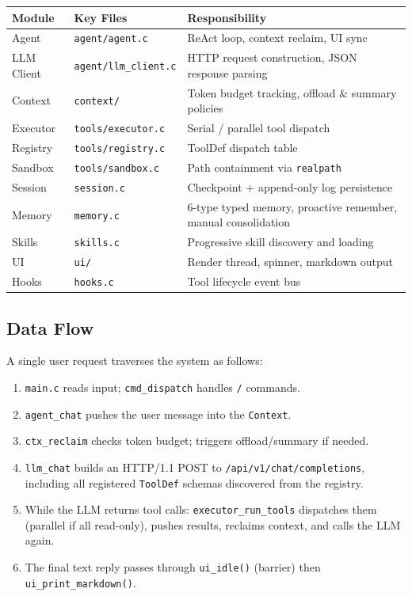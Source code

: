 \documentclass[11pt,a4paper]{article}
\begin{document}
\begin{center}
\small
\begin{tabularx}{\textwidth}{l l X}
\toprule
\textbf{Module} & \textbf{Key Files} & \textbf{Responsibility} \\
\midrule
Agent      & \texttt{agent/agent.c}      & ReAct loop, context reclaim, UI sync \\
LLM Client & \texttt{agent/llm\_client.c} & HTTP request construction, JSON response parsing \\
Context    & \texttt{context/}           & Token budget tracking, offload \& summary policies \\
Executor   & \texttt{tools/executor.c}   & Serial / parallel tool dispatch \\
Registry   & \texttt{tools/registry.c}   & ToolDef dispatch table \\
Sandbox    & \texttt{tools/sandbox.c}    & Path containment via \texttt{realpath} \\
Session    & \texttt{session.c}          & Checkpoint + append-only log persistence \\
Memory     & \texttt{memory.c}           & 6-type typed memory, proactive remember, manual consolidation \\
Skills     & \texttt{skills.c}           & Progressive skill discovery and loading \\
UI         & \texttt{ui/}               & Render thread, spinner, markdown output \\
Hooks      & \texttt{hooks.c}           & Tool lifecycle event bus \\
\bottomrule
\end{tabularx}
\end{center}

\subsection{Data Flow}

A single user request traverses the system as follows:

\begin{enumerate}[leftmargin=2em]
  \item \texttt{main.c} reads input; \texttt{cmd\_dispatch} handles \texttt{/} commands.
  \item \texttt{agent\_chat} pushes the user message into the \texttt{Context}.
  \item \texttt{ctx\_reclaim} checks token budget; triggers offload/summary if needed.
  \item \texttt{llm\_chat} builds an HTTP/1.1 POST to \texttt{/api/v1/chat/completions},
        including all registered \texttt{ToolDef} schemas discovered from the registry.
  \item While the LLM returns tool calls: \texttt{executor\_run\_tools} dispatches them
        (parallel if all read-only), pushes results, reclaims context, and calls the LLM again.
  \item The final text reply passes through \texttt{ui\_idle()} (barrier) then
        \texttt{ui\_print\_markdown()}.
\end{enumerate}
\end{document}

